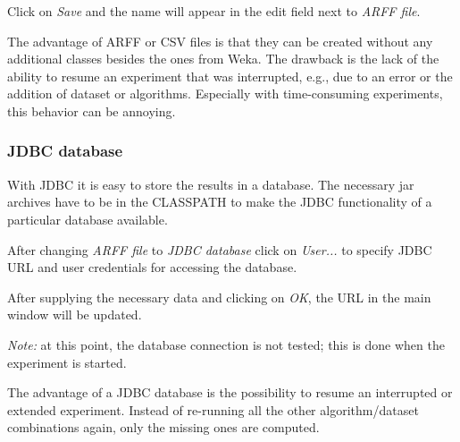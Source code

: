 \begin{center}
\end{center}


Click on \textit{Save} and the name will appear in the edit field next to \textit{ARFF file}.

\begin{center}
\end{center}


The advantage of ARFF or CSV files is that they can be created without any additional classes besides the ones from Weka. The drawback is the lack of the ability to resume an experiment that was interrupted, e.g., due to an error or the addition of dataset or algorithms. Especially with time-consuming experiments, this behavior can be annoying.


\subsubsection*{JDBC database}

With JDBC it is easy to store the results in a database. The necessary jar archives have to be in the CLASSPATH to make the JDBC functionality of a particular database available.

After changing \textit{ARFF file} to \textit{JDBC database} click on \textit{User...} to specify JDBC URL and user credentials for accessing the database.

\begin{center}
\end{center}


After supplying the necessary data and clicking on \textit{OK}, the URL in the main window will be updated.

\textit{Note:} at this point, the database connection is not tested; this is done when the experiment is started.

\begin{center}
\end{center}


The advantage of a JDBC database is the possibility to resume an interrupted or extended experiment. Instead of re-running all the other algorithm/dataset combinations again, only the missing ones are computed.


